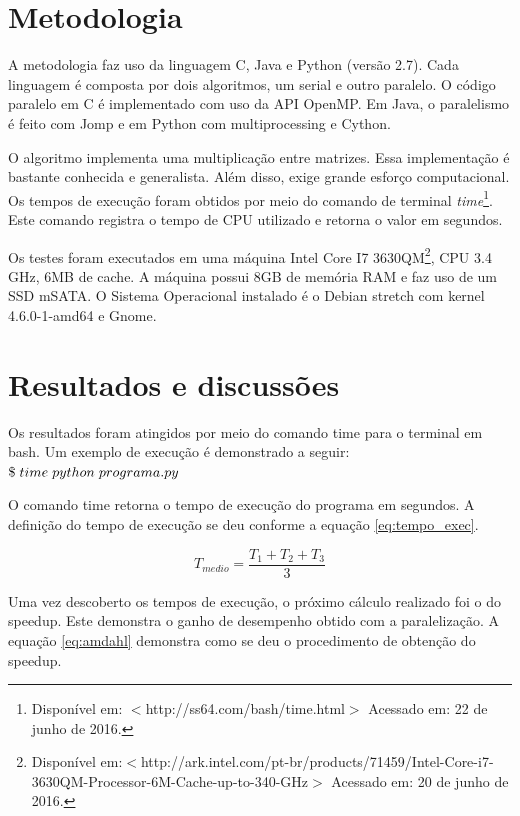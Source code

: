 \documentclass[a4paper,12pt]{article}
\begin{document}
\section{Metodologia}
A metodologia faz uso da linguagem C, Java e Python (versão 2.7). Cada linguagem é composta por dois algoritmos, um serial e outro paralelo. O código paralelo em C é implementado com uso da API OpenMP. Em Java, o paralelismo é feito com Jomp e em Python com multiprocessing e Cython. 

O algoritmo implementa uma multiplicação entre matrizes. Essa implementação é bastante conhecida e generalista. Além disso, exige grande esforço computacional. Os tempos de execução foram obtidos por meio do comando de terminal {\it time}\footnote{Disponível em: $<$http://ss64.com/bash/time.html$>$ Acessado em: 22 de junho de 2016.}. Este comando registra o tempo de CPU utilizado e retorna o valor em segundos.  

Os testes foram executados em uma máquina Intel Core I7 3630QM\footnote{Disponível em:$<$http://ark.intel.com/pt-br/products/71459/Intel-Core-i7-3630QM-Processor-6M-Cache-up-to-3\underline{\hspace{0.1cm}}40-GHz$>$ Acessado em: 20 de junho de 2016.}, CPU 3.4 GHz, 6MB de cache. A máquina possui 8GB de memória RAM e faz uso de um SSD mSATA. O Sistema Operacional instalado é o Debian stretch com kernel 4.6.0-1-amd64 e Gnome.

\section{Resultados e discussões}

Os resultados foram atingidos por meio do comando time para o terminal em bash. Um exemplo de execução é demonstrado a seguir: 
$\$\hspace{0.1cm} time \hspace{0.1cm} python \hspace{0.1cm}programa.py$

O comando time retorna o tempo de execução do programa em segundos. A definição do tempo de execução se deu conforme a equação \ref{eq:tempo_exec}.

\begin{equation}
  \label{eq:tempo_exec}
   T_{medio} = \frac{T_{1} + T_{2} + T_{3}}{3}
\end{equation}

Uma vez descoberto os tempos de execução, o próximo cálculo realizado foi o do speedup. Este demonstra o ganho de desempenho obtido com a paralelização. A equação \hyperlink{eq:amdahl}{\ref{eq:amdahl}} demonstra como se deu o procedimento de obtenção do speedup.
\end{document}
